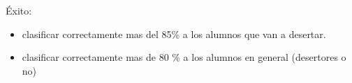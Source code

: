 
Éxito:
\begin{itemize}
	\item clasificar correctamente mas del 85\% a los alumnos que van a desertar.
	\item clasificar correctamente mas de 80 \% a los alumnos en general (desertores o no)
\end{itemize}